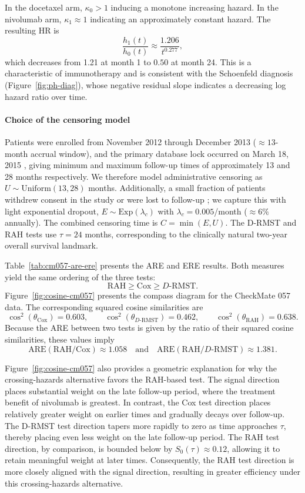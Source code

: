 \documentclass[12pt]{article}
\newcommand{\RAH}{\mathrm{RAH}}
\newcommand{\DRMST}{D\text{-}\mathrm{RMST}}
\begin{document}
In the docetaxel arm, $\kappa_0>1$ inducing a monotone increasing
hazard. In the nivolumab arm,  $\kappa_1\approx1$ indicating an approximately constant hazard. The resulting HR is
\[
  \frac{h_1(t)}{h_0(t)}
  \approx \frac{1.206}{t^{0.277}},
\]
which decreases from 1.21 at month 1 to $0.50$ at month 24.   This is a characteristic of immunotherapy and is consistent with the Schoenfeld diagnosis
(Figure~\ref{fig:ph-diag}), whose negative residual slope indicates a
decreasing log hazard ratio over time.

\paragraph{Choice of the censoring model}
Patients were enrolled from November 2012 through December 2013
(${\approx}13$-month accrual window), and the primary database lock
occurred on March 18, 2015 \citep{Borghaei2015}, giving minimum and
maximum follow-up times of approximately 13 and 28 months respectively.
We therefore model administrative censoring as
$U\sim \mathrm{Uniform}(13, 28)$ months.
Additionally, a small fraction of patients withdrew consent in the study or were lost to follow-up \citep{Borghaei2015}; we capture
this with light exponential dropout, $E \sim \mbox{Exp}(\lambda_c)$ with $\lambda_c = 0.005$/month (${\approx}6\%$ annually). The combined censoring time is $C = \min(E, U)$.
The D-RMST and RAH tests use $\tau = 24$ months, corresponding to the clinically natural two-year overall survival landmark.



Table~\ref{tab:cm057-are-ere} presents the ARE and ERE results. Both measures yield the same ordering of the three tests:
\[
\RAH \ge \mathrm{Cox} \ge \DRMST.
\]
Figure~\ref{fig:cosine-cm057} presents the compass diagram for the CheckMate 057 data. The corresponding squared cosine similarities are
\[
\cos^2(\theta_{\mathrm{Cox}})=0.603,\qquad
\cos^2(\theta_{\DRMST})=0.462,\qquad
\cos^2(\theta_{\RAH})=0.638.
\]
Because the ARE between two tests is given by the ratio of their squared cosine similarities, these values imply
\[
\mathrm{ARE}(\RAH/\mathrm{Cox})\approx1.058
\quad\text{and}\quad
\mathrm{ARE}(\RAH/\DRMST)\approx1.381.
\]

Figure~\ref{fig:cosine-cm057} also provides a geometric explanation for why the crossing-hazards alternative favors the RAH-based test. The signal direction places substantial weight on the late follow-up period, where the treatment benefit of nivolumab is greatest. In contrast, the Cox test direction places relatively greater weight on earlier times and gradually decays over follow-up. The D-RMST test direction tapers more rapidly to zero as time approaches $\tau$, thereby placing even less weight on the late follow-up period. The RAH test direction, by comparison, is bounded below by $S_0(\tau)\approx0.12$, allowing it to retain meaningful weight at later times. Consequently, the RAH test direction is more closely aligned with the signal direction, resulting in greater efficiency under this crossing-hazards alternative.
\end{document}
